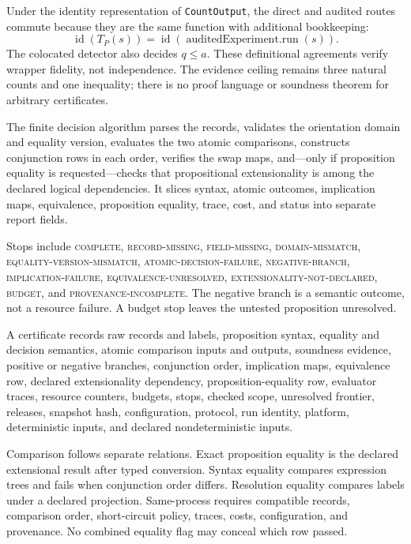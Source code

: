 Under the identity representation of \texttt{CountOutput}, the direct and audited routes commute because they are the
same function with additional bookkeeping:
\[
 \operatorname{id}(T_P(s))=
 \operatorname{id}(\operatorname{auditedExperiment.run}(s)).
\]
The colocated detector also decides \(q\le a\).  These definitional agreements verify wrapper fidelity, not
independence.  The evidence ceiling remains three natural counts and one inequality; there is no proof language or
soundness theorem for arbitrary certificates.

The finite decision algorithm parses the records, validates the orientation domain and equality version, evaluates
the two atomic comparisons, constructs conjunction rows in each order, verifies the swap maps, and---only if
proposition equality is requested---checks that propositional extensionality is among the declared logical
dependencies.  It slices syntax, atomic outcomes, implication maps, equivalence, proposition equality, trace, cost,
and status into separate report fields.

Stops include \textsc{complete}, \textsc{record-missing}, \textsc{field-missing}, \textsc{domain-mismatch},
\textsc{equality-version-mismatch}, \textsc{atomic-decision-failure}, \textsc{negative-branch},
\textsc{implication-failure}, \textsc{equivalence-unresolved}, \textsc{extensionality-not-declared},
\textsc{budget}, and \textsc{provenance-incomplete}.  The negative branch is a semantic outcome, not a resource
failure.  A budget stop leaves the untested proposition unresolved.

A certificate records raw records and labels, proposition syntax, equality and decision semantics, atomic comparison
inputs and outputs, soundness evidence, positive or negative branches, conjunction order, implication maps,
equivalence row, declared extensionality dependency, proposition-equality row, evaluator traces, resource counters,
budgets, stops, checked scope, unresolved frontier, releases, snapshot hash, configuration, protocol, run identity,
platform, deterministic inputs, and declared nondeterministic inputs.

Comparison follows separate relations.  Exact proposition equality is the declared extensional result after typed
conversion.  Syntax equality compares expression trees and fails when conjunction order differs.  Resolution equality
compares labels under a declared projection.  Same-process requires compatible records, comparison order,
short-circuit policy, traces, costs, configuration, and provenance.  No combined equality flag may conceal which row
passed.

